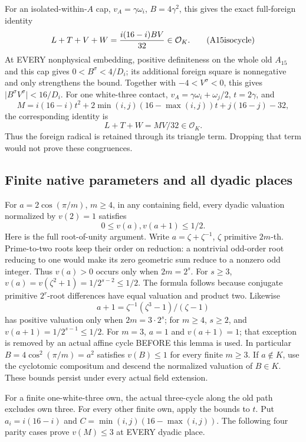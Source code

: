 \documentclass[11pt]{article}
\begin{document}
For an isolated-within-\(A\) cap,
\(v_A=\gamma\omega_i\), \(B=4\gamma^2\),
this gives the exact full-foreign identity
\[
              L+T+V+W={i(16-i)BV\over32}\in\mathcal O_K.
\tag{A15isocycle}\label{eq:arithA15isocycle}
\]
At EVERY nonphysical embedding, positive definiteness on the
whole old \(A_{15}\) and this cap gives
\(0<B^\sigma<4/D_i\); its additional foreign square is
nonnegative and only strengthens the bound.
Together with \(-4<V^\sigma<0\), this gives
\(\lvert B^\sigma V^\sigma\rvert<16/D_i\).
For one white-three contact,
\(v_A=\gamma\omega_i+\omega_j/2\),
\(t=2\gamma\), and
\[
 M=i(16-i)t^2+2\min(i,j)(16-\max(i,j))t+j(16-j)-32,
\]
the corresponding identity is
\[
                         L+T+W=MV/32\in\mathcal O_K.
\tag{A15whitecycle}\label{eq:arithA15whitecycle}
\]
Thus the foreign radical is retained through its triangle term.
Dropping that term would not prove these congruences.

\subsection{Finite native parameters and all dyadic places}
\label{app:arithA15dyadic}

For \(a=2\cos(\pi/m)\), \(m\ge4\), in any containing field,
every dyadic valuation normalized by \(v(2)=1\) satisfies
\[
                         0\le v(a),v(a+1)\le1/2 .
\]
Here is the full root-of-unity argument.
Write \(a=\zeta+\zeta^{-1}\), \(\zeta\) primitive \(2m\)-th.
Prime-to-two roots keep their order on reduction: a nontrivial
odd-order root reducing to one would make its zero geometric
sum reduce to a nonzero odd integer.
Thus \(v(a)>0\) occurs only when \(2m=2^s\).
For \(s\ge3\),
\(v(a)=v(\zeta^2+1)=1/2^{s-2}\le1/2\).
The formula follows because conjugate primitive \(2^r\)-root
differences have equal valuation and product two.
Likewise
\[
                a+1=\zeta^{-1}(\zeta^3-1)/(\zeta-1)
\]
has positive valuation only when \(2m=3\cdot2^s\);
for \(m\ge4\), \(s\ge2\), and
\(v(a+1)=1/2^{s-1}\le1/2\).
For \(m=3\), \(a=1\) and \(v(a+1)=1\); that exception is
removed by an actual affine cycle BEFORE this lemma is used.
In particular \(B=4\cos^2(\pi/m)=a^2\) satisfies \(v(B)\le1\)
for every finite \(m\ge3\).
If \(a\notin K\), use the cyclotomic compositum and descend
the normalized valuation of \(B\in K\).
These bounds persist under every actual field extension.

For a finite one-white-three own, the actual three-cycle
along the old path excludes own three.
For every other finite own, apply the bounds to \(t\).
Put \(a_i=i(16-i)\) and \(C=\min(i,j)(16-\max(i,j))\).
The following four parity cases prove \(v(M)\le3\)
at EVERY dyadic place.
\end{document}
